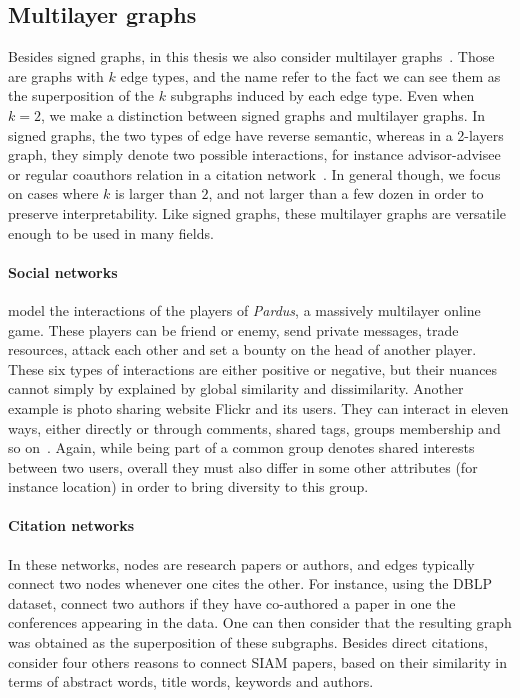 

\subsection{Multilayer graphs}
\label{sub:intro_multilayer_graphs}

Besides signed graphs, in this thesis we also consider multilayer
graphs~\autocites{Kivela2014}{multiSurvey14}. Those are graphs with $k$ edge types, and the name
refer to the fact we can see them as the superposition of the $k$ subgraphs induced by each edge
type. Even when $k=2$, we make a distinction between signed graphs and multilayer graphs. In signed
graphs, the two types of edge have reverse semantic, whereas in a 2-layers graph, they simply
denote two possible interactions, for instance advisor-advisee or regular coauthors relation in a
citation network~\autocite{Advisor10}. In general though, we focus on cases where $k$ is larger than
$2$, and not larger than a few dozen in order to preserve interpretability.
Like signed graphs, these multilayer graphs are versatile enough to be used in many fields.

\paragraph{Social networks} \Textcite{Szell2010} model the interactions of the players of
\emph{Pardus}, a massively multilayer online game. These players can be friend or enemy, send
private messages, trade resources, attack each other and set a bounty on the head of another
player. These six types of interactions are either positive or negative, but their nuances cannot
simply by explained by global similarity and dissimilarity. Another example is photo sharing website
Flickr and its users. They can interact in eleven ways, either directly or through
comments, shared tags, groups membership and so on~\autocite{RecoFlickrMulti11}. Again, while being
part of a common group denotes shared interests between two users, overall they must also differ in
some other attributes (for instance location) in order to bring diversity to this group.

\paragraph{Citation networks} In these networks, nodes are research papers or authors, and edges
typically connect two nodes whenever one cites the other. For instance, using the DBLP dataset,
\textcite{communityDBLPbyConf05} connect two authors if they have co-authored a paper in one the
 conferences appearing in the data. One can then consider that the resulting graph was
obtained as the superposition of these  subgraphs. Besides direct citations,
\textcite{articlesMultiSim11} consider four others reasons to connect  SIAM papers, based
on their similarity in terms of abstract words, title words, keywords and authors.

